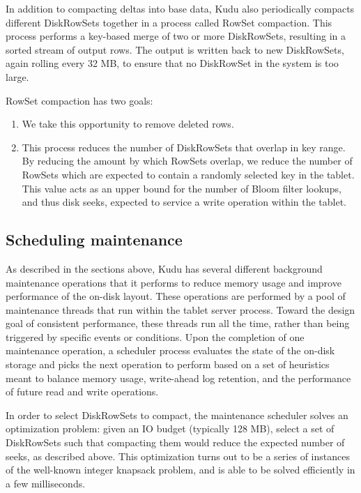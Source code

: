 \documentclass{vldb}
\begin{document}
In addition to compacting deltas into base data, Kudu also periodically compacts different
DiskRowSets together in a process called RowSet compaction. This process performs a
key-based merge of two or more DiskRowSets, resulting in a sorted stream of output rows.
The output is written back to new DiskRowSets, again rolling every 32 MB, to ensure that no
DiskRowSet in the system is too large.

RowSet compaction has two goals:
\begin{enumerate}
\item We take this opportunity to remove deleted rows.
\item This process reduces the number of DiskRowSets that overlap in key range.
By reducing the amount by which RowSets overlap, we reduce the number of RowSets
which are expected to contain a randomly selected key in the tablet. This value acts
as an upper bound for the number of Bloom filter lookups, and thus disk seeks, expected
to service a write operation within the tablet.
\end{enumerate}

\subsection{Scheduling maintenance}
\label{sec:maintenance}

As described in the sections above, Kudu has several different background maintenance operations
that it performs to reduce memory usage and improve performance of the on-disk layout. These
operations are performed by a pool of maintenance threads that run within the tablet server
process. Toward the design goal of consistent performance, these
threads run all the time, rather than being triggered by specific events or conditions.
Upon the completion of one maintenance operation, a scheduler process evaluates the
state of the on-disk storage and picks the next operation to perform based on a set
of heuristics meant to balance memory usage, write-ahead log retention, and the
performance of future read and write operations.

In order to select DiskRowSets to compact, the maintenance scheduler solves an optimization
problem: given an IO budget (typically 128 MB), select a set of DiskRowSets
such that compacting them would reduce the expected number of seeks, as described above.
This optimization turns out to be a series of instances of the well-known integer knapsack
problem, and is able to be solved efficiently in a few milliseconds.
\end{document}
